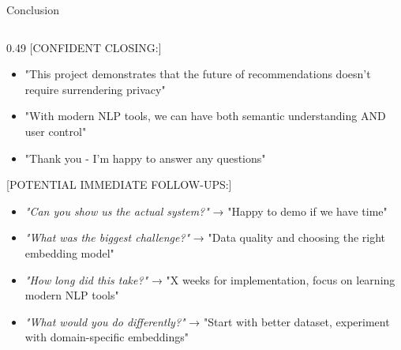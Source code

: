 \begin{frame}{Conclusion}
{\begin{columns}[T]
    \begin{column}{0.49\textwidth}
      [CONFIDENT CLOSING:]
      \begin{itemize}
        \item "This project demonstrates that the future of recommendations doesn't require surrendering privacy"
        \item "With modern NLP tools, we can have both semantic understanding AND user control"
        \item "Thank you - I'm happy to answer any questions"
      \end{itemize}
      
      \vspace{0.1cm}
      [POTENTIAL IMMEDIATE FOLLOW-UPS:]
      \begin{itemize}
        \item \textit{"Can you show us the actual system?"} → "Happy to demo if we have time"
        \item \textit{"What was the biggest challenge?"} → "Data quality and choosing the right embedding model"
        \item \textit{"How long did this take?"} → "X weeks for implementation, focus on learning modern NLP tools"
        \item \textit{"What would you do differently?"} → "Start with better dataset, experiment with domain-specific embeddings"
      \end{itemize}
    \end{column}
  \end{columns}
}

\end{frame}